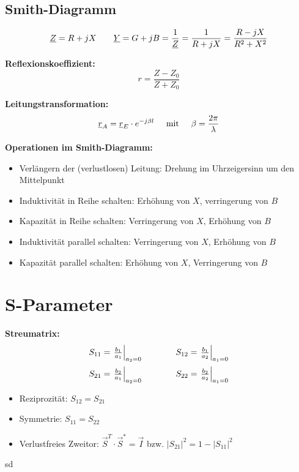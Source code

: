 \documentclass[german]{latex4ei/latex4ei_sheet}
\begin{document}
\subsection{Smith-Diagramm}
\begin{sectionbox}
    \[
        \underline{Z} = R + jX \hspace{7mm} \underline{Y} = G + jB = \frac{1}{\underline{Z}} = \frac{1}{R + jX} = \frac{R - jX}{R^2 + X^2}
    \]


    \textbf{Reflexionskoeffizient:}
    \[
        r = \frac{Z - Z_0}{Z + Z_0}
    \]

    \textbf{Leitungstransformation:}
    \[
        \underline{r}_A = \underline{r}_E \cdot e^{-j\beta l} \hspace{5mm} \text{mit} \hspace{5mm} \beta = \frac{2\pi}{\lambda}
    \]



    \textbf{Operationen im Smith-Diagramm:}
    \begin{itemize}
        \item Verlängern der (verlustlosen) Leitung: Drehung im Uhrzeigersinn um den Mittelpunkt
        \item Induktivität in Reihe schalten: Erhöhung von $X$, verringerung von $B$
        \item Kapazität in Reihe schalten: Verringerung von $X$, Erhöhung von $B$
        \item Induktivität parallel schalten: Verringerung von $X$, Erhöhung von $B$
        \item Kapazität parallel schalten: Erhöhung von $X$, Verringerung von $B$
    \end{itemize}

\end{sectionbox}

\section{S-Parameter}
\begin{sectionbox}
    \textbf{Streumatrix:}
    \[
        \setlength{\arraycolsep}{20pt}
        \begin{array}{cccc}
        S_{11} = \left. \frac{b_1}{a_1} \right|_{a_2 = 0} & 
        S_{12} = \left. \frac{b_1}{a_2} \right|_{a_1 = 0} \\[10pt]
        S_{21} = \left. \frac{b_2}{a_1} \right|_{a_2 = 0} &
        S_{22} = \left. \frac{b_2}{a_2} \right|_{a_1 = 0}
        \end{array}
    \]
    
    \begin{itemize}
        \item Reziprozität: $S_{12} = S_{21}$
        \item Symmetrie: $S_{11} = S_{22}$
        \item Verlustfreies Zweitor: $\vec{S}^T \cdot \vec{S}^* = \vec{I}$  bzw.  $|S_{21}|^2 = 1 - |S_{11}|^2$
    \end{itemize}
    
\end{sectionbox}
sd
\end{document}
